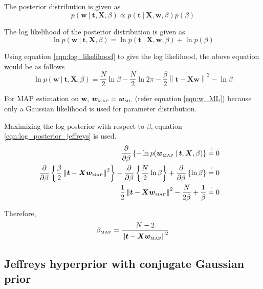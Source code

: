 \documentclass[11pt]{article}
\newcommand{\mle}[1]{{#1}_{\text{\tiny ML}}}
\newcommand{\map}[1]{{#1}_{\text{\tiny MAP}}}
\newcommand\given[1][]{\:#1\vert\:}
\newcommand{\norm}[1]{\left\lVert#1\right\rVert}
\begin{document}
\vspace{5mm}

The posterior distribution is given as
\begin{equation}
    p(\bm{w} \given \bm{t}, \bm{X}, \beta) \propto p(\bm{t} \given \bm{X}, \bm{w}, \beta) p(\beta)
\end{equation}

The log likelihood of the posterior distribution is given as
\begin{equation} 
    \ln{p(\bm{w} \given \bm{t}, \bm{X}, \beta)} = \ln{p(\bm{t} \given \bm{X}, \bm{w}, \beta)} + \ln{p(\beta)}
\end{equation}

Using equation \ref{eqn:log_likelihood} to give the log likelihood, the above equation would be as follows
\begin{equation} \label{eqn:log_posterior_jeffreys}
    \ln{p(\bm{w} \given \bm{t}, \bm{X}, \beta)} = \frac{N}{2}\ln{\beta} - \frac{N}{2}\ln{2\pi} - \frac{\beta}{2} \norm{\bm{t} - \bm{Xw}}^2 - \ln{\beta}
\end{equation}

For MAP estimation on $\bm{w}$, $\map{\bm{w}} = \mle{\bm w}$ (refer equation \ref{eqn:w_ML}) because only a Gaussian likelihood is used for parameter distribution. 

\vspace{5mm}

Maximizing the log posterior with respect to $\beta$, equation \ref{eqn:log_posterior_jeffreys} is used.
\begin{eqnarray}
    \frac{\partial }{\partial  \beta} \left\{ -\ln{p(\map{\bm{w}} \given \bm{t}, \bm{X}, \beta)} \right\} 
    &\overset{!}{=} 0& \\
    \frac{\partial }{\partial \beta} \left\{\frac{\beta}{2} \norm{\bm{t} - \bm{X}\map{\bm{w}}}^2 \right\}
    - \frac{\partial }{\partial \beta} \left\{\frac{N}{2}\ln{\beta} \right\} + \frac{\partial }{\partial \beta} \left\{ \ln{\beta} \right\}
    &\overset{!}{=} 0& \\
    \frac{1}{2} \norm{\bm{t} - \bm{X}\map{\bm{w}}}^2 - \frac{N}{2\beta} + \frac{1}{\beta}
    &\overset{!}{=} 0&
\end{eqnarray}

Therefore, 
\begin{equation} \label{beta_map}
    \map{\beta} = \frac{N-2}{\norm{\bm{t} - \bm{X}\map{\bm{w}}}^2}
\end{equation}

\subsection{Jeffreys hyperprior with conjugate Gaussian prior}
\end{document}
